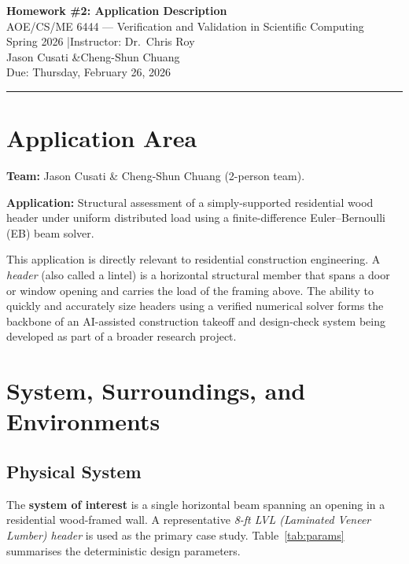 \documentclass[11pt,letterpaper]{article}
\begin{document}
\begin{center}
  {\LARGE\bfseries Homework \#2: Application Description}\\[6pt]
  {\large AOE/CS/ME 6444 — Verification and Validation in Scientific Computing}\\
  {\large Spring 2026 \quad|\quad Instructor: Dr.\ Chris Roy}\\[4pt]
  {\large Jason Cusati \quad\&\quad Cheng-Shun Chuang}\\[2pt]
  {\normalsize Due: Thursday, February 26, 2026}
\end{center}
\vspace{6pt}
\hrule
\vspace{10pt}

\section{Application Area}
\label{sec:app}

\textbf{Team:} Jason Cusati \& Cheng-Shun Chuang (2-person team).

\textbf{Application:} Structural assessment of a simply-supported residential wood header
under uniform distributed load using a finite-difference Euler--Bernoulli (EB) beam solver.

This application is directly relevant to residential construction engineering.
A \emph{header} (also called a lintel) is a horizontal structural member that spans a
door or window opening and carries the load of the framing above.
The ability to quickly and accurately size headers using a verified numerical solver forms
the backbone of an AI-assisted construction takeoff and design-check system being
developed as part of a broader research project.

\section{System, Surroundings, and Environments}
\label{sec:system}

\subsection{Physical System}

The \textbf{system of interest} is a single horizontal beam spanning an opening
in a residential wood-framed wall.
A representative \emph{8-ft LVL (Laminated Veneer Lumber) header} is used as the
primary case study.
Table~\ref{tab:params} summarises the deterministic design parameters.
\end{document}

